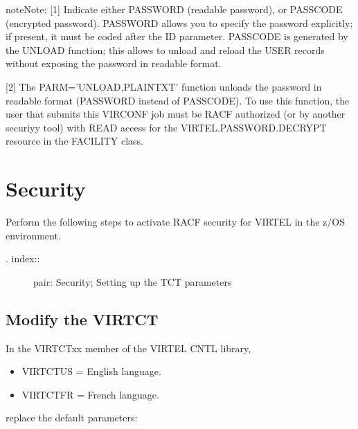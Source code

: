\documentclass[letterpaper,10pt,english]{sphinxmanual}
\begin{document}
\begin{sphinxadmonition}{note}{Note:}
{[}1{]} Indicate either PASSWORD (readable password), or PASSCODE (encrypted password). PASSWORD allows you to specify the password explicitly; if present, it must be coded after the ID parameter. PASSCODE is generated by the UNLOAD function; this allows to unload and reload the USER records without exposing the password in readable format.

{[}2{]} The PARM=’UNLOAD,PLAINTXT’ function unloads the password in readable format (PASSWORD instead of PASSCODE). To use this function, the user that submits this VIRCONF job must be RACF authorized (or by another securiyy tool) with READ access for the VIRTEL.PASSWORD.DECRYPT resource in the FACILITY class.
\end{sphinxadmonition}
\label{\detokenize{Installation_Guide:v457ig-security}}

\chapter{Security}
\label{\detokenize{Installation_Guide:index-38}}\label{\detokenize{Installation_Guide:security}}
Perform the following steps to activate RACF security for VIRTEL in the z/OS environment.
\begin{description}
\item[{. index::}] \leavevmode
pair: Security; Setting up the TCT parameters

\end{description}


\section{Modify the VIRTCT}
\label{\detokenize{Installation_Guide:modify-the-virtct}}
In the VIRTCTxx member of the VIRTEL CNTL library,
\begin{itemize}
\item {} 
VIRTCTUS = English language.

\item {} 
VIRTCTFR = French language.

\end{itemize}

replace the default parameters:

\begin{sphinxVerbatim}[commandchars=\\\{\}]
\end{sphinxVerbatim}
\end{document}
